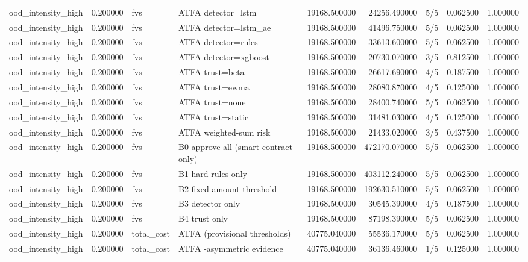 \begin{tabular}{lrllrrlrr}
ood\_intensity\_high & 0.200000 & fvs & ATFA detector=lstm & 19168.500000 & 24256.490000 & 5/5 & 0.062500 & 1.000000 \\
ood\_intensity\_high & 0.200000 & fvs & ATFA detector=lstm\_ae & 19168.500000 & 41496.750000 & 5/5 & 0.062500 & 1.000000 \\
ood\_intensity\_high & 0.200000 & fvs & ATFA detector=rules & 19168.500000 & 33613.600000 & 5/5 & 0.062500 & 1.000000 \\
ood\_intensity\_high & 0.200000 & fvs & ATFA detector=xgboost & 19168.500000 & 20730.070000 & 3/5 & 0.812500 & 1.000000 \\
ood\_intensity\_high & 0.200000 & fvs & ATFA trust=beta & 19168.500000 & 26617.690000 & 4/5 & 0.187500 & 1.000000 \\
ood\_intensity\_high & 0.200000 & fvs & ATFA trust=ewma & 19168.500000 & 28080.870000 & 4/5 & 0.125000 & 1.000000 \\
ood\_intensity\_high & 0.200000 & fvs & ATFA trust=none & 19168.500000 & 28400.740000 & 5/5 & 0.062500 & 1.000000 \\
ood\_intensity\_high & 0.200000 & fvs & ATFA trust=static & 19168.500000 & 31481.030000 & 4/5 & 0.125000 & 1.000000 \\
ood\_intensity\_high & 0.200000 & fvs & ATFA weighted-sum risk & 19168.500000 & 21433.020000 & 3/5 & 0.437500 & 1.000000 \\
ood\_intensity\_high & 0.200000 & fvs & B0 approve all (smart contract only) & 19168.500000 & 472170.070000 & 5/5 & 0.062500 & 1.000000 \\
ood\_intensity\_high & 0.200000 & fvs & B1 hard rules only & 19168.500000 & 403112.240000 & 5/5 & 0.062500 & 1.000000 \\
ood\_intensity\_high & 0.200000 & fvs & B2 fixed amount threshold & 19168.500000 & 192630.510000 & 5/5 & 0.062500 & 1.000000 \\
ood\_intensity\_high & 0.200000 & fvs & B3 detector only & 19168.500000 & 30545.390000 & 4/5 & 0.187500 & 1.000000 \\
ood\_intensity\_high & 0.200000 & fvs & B4 trust only & 19168.500000 & 87198.390000 & 5/5 & 0.062500 & 1.000000 \\
ood\_intensity\_high & 0.200000 & total\_cost & ATFA (provisional thresholds) & 40775.040000 & 55536.170000 & 5/5 & 0.062500 & 1.000000 \\
ood\_intensity\_high & 0.200000 & total\_cost & ATFA -asymmetric evidence & 40775.040000 & 36136.460000 & 1/5 & 0.125000 & 1.000000 \\

\end{tabular}
